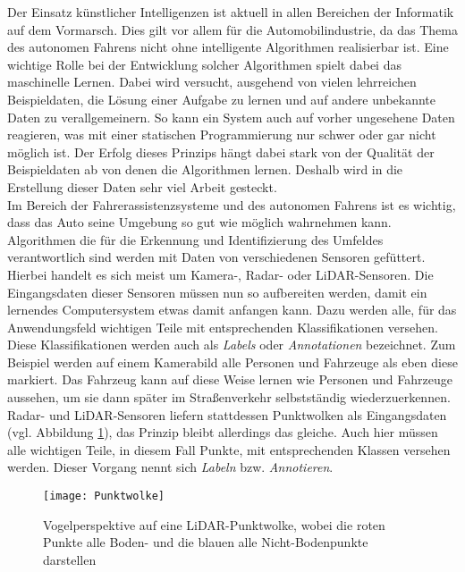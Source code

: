 \graphicspath{{Kapitel/Kapitel1_Einleitung/Images/}}

Der Einsatz künstlicher Intelligenzen ist aktuell in allen Bereichen der Informatik auf dem Vormarsch. Dies gilt vor allem für die Automobilindustrie, da das Thema des autonomen Fahrens nicht ohne intelligente Algorithmen realisierbar ist. Eine wichtige Rolle bei der Entwicklung solcher Algorithmen spielt dabei das maschinelle Lernen. Dabei wird versucht, ausgehend von vielen lehrreichen Beispieldaten, die Lösung einer Aufgabe zu lernen und auf andere unbekannte Daten zu verallgemeinern. So kann ein System auch auf vorher ungesehene Daten reagieren, was mit einer statischen Programmierung nur schwer oder gar nicht möglich ist. Der Erfolg dieses Prinzips hängt dabei stark von der Qualität der Beispieldaten ab von denen die Algorithmen lernen. Deshalb wird in die Erstellung dieser Daten sehr viel Arbeit gesteckt.\\

Im Bereich der Fahrerassistenzsysteme und des autonomen Fahrens ist es wichtig, dass das Auto seine Umgebung so gut wie möglich wahrnehmen kann. Algorithmen die für die Erkennung und Identifizierung des Umfeldes verantwortlich sind werden mit Daten von verschiedenen Sensoren gefüttert. Hierbei handelt es sich meist um Kamera-, Radar- oder LiDAR-Sensoren. Die Eingangsdaten dieser Sensoren müssen nun so aufbereiten werden, damit ein lernendes Computersystem etwas damit anfangen kann. Dazu werden alle, für das Anwendungsfeld wichtigen Teile mit entsprechenden Klassifikationen versehen. Diese Klassifikationen werden auch als \textit{Labels} oder \textit{Annotationen} bezeichnet. Zum Beispiel werden auf einem Kamerabild alle Personen und Fahrzeuge als eben diese markiert. Das Fahrzeug kann auf diese Weise lernen wie Personen und Fahrzeuge aussehen, um sie dann später im Straßenverkehr selbstständig wiederzuerkennen. Radar- und LiDAR-Sensoren liefern stattdessen Punktwolken als Eingangsdaten (vgl. Abbildung \ref{fig:Punktwolke}), das Prinzip bleibt allerdings das gleiche. Auch hier müssen alle wichtigen Teile, in diesem Fall Punkte, mit entsprechenden Klassen versehen werden. Dieser Vorgang nennt sich \textit{Labeln} bzw. \textit{Annotieren}.\\

\begin{figure}%
\centering
    \texttt{[image: Punktwolke]}
    \caption{Vogelperspektive auf eine LiDAR-Punktwolke, wobei die roten Punkte alle Boden- und die blauen alle Nicht-Bodenpunkte darstellen}
	\label{fig:Punktwolke}
\end{figure}

